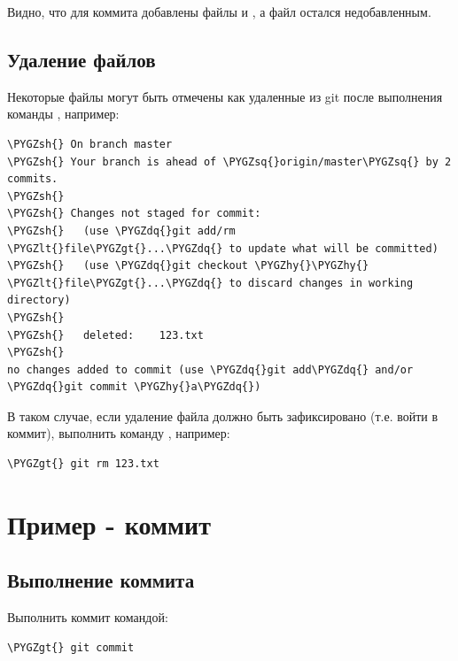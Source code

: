\documentclass[a4paper,12pt,oneside]{sphinxmanual}
\def\PYGZlt{\char`\<}
\def\PYGZgt{\char`\>}
\def\PYGZsh{\char`\#}
\def\PYGZhy{\char`\-}
\def\PYGZsq{\char`\'}
\def\PYGZdq{\char`\"}
\begin{document}
Видно, что для коммита добавлены файлы  и , а файл  остался недобавленным.


\subsection{Удаление файлов}
\label{git_short_manual:id11}
Некоторые файлы могут быть отмечены как удаленные из git после выполнения команды , например:

\begin{Verbatim}[commandchars=\\\{\}]
\PYGZsh{} On branch master
\PYGZsh{} Your branch is ahead of \PYGZsq{}origin/master\PYGZsq{} by 2 commits.
\PYGZsh{}
\PYGZsh{} Changes not staged for commit:
\PYGZsh{}   (use \PYGZdq{}git add/rm \PYGZlt{}file\PYGZgt{}...\PYGZdq{} to update what will be committed)
\PYGZsh{}   (use \PYGZdq{}git checkout \PYGZhy{}\PYGZhy{} \PYGZlt{}file\PYGZgt{}...\PYGZdq{} to discard changes in working directory)
\PYGZsh{}
\PYGZsh{}   deleted:    123.txt
\PYGZsh{}
no changes added to commit (use \PYGZdq{}git add\PYGZdq{} and/or \PYGZdq{}git commit \PYGZhy{}a\PYGZdq{})
\end{Verbatim}

В таком случае, если удаление файла должно быть зафиксировано (т.е. войти в коммит), выполнить команду , например:

\begin{Verbatim}[commandchars=\\\{\}]
\PYGZgt{} git rm 123.txt
\end{Verbatim}


\section{Пример - коммит}
\label{git_short_manual:git-commit}\label{git_short_manual:index-5}\label{git_short_manual:id12}

\subsection{Выполнение коммита}
\label{git_short_manual:id13}
Выполнить коммит командой:

\begin{Verbatim}[commandchars=\\\{\}]
\PYGZgt{} git commit
\end{Verbatim}
\end{document}
